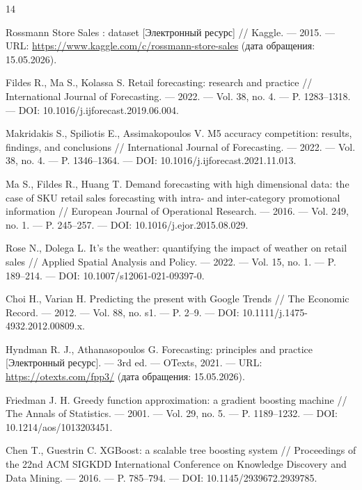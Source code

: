 \documentclass[12pt,a4paper]{article}
\numberwithin{equation}{section}
\begin{document}
\begin{thebibliography}{14}

Rossmann Store Sales : dataset [Электронный ресурс] // Kaggle. --- 2015. ---
URL: \url{https://www.kaggle.com/c/rossmann-store-sales} (дата обращения:
15.05.2026).

Fildes R., Ma S., Kolassa S. Retail forecasting: research and practice //
International Journal of Forecasting. --- 2022. --- Vol. 38, no. 4. ---
P. 1283--1318. --- DOI: 10.1016/j.ijforecast.2019.06.004.

Makridakis S., Spiliotis E., Assimakopoulos V. M5 accuracy competition:
results, findings, and conclusions // International Journal of Forecasting. ---
2022. --- Vol. 38, no. 4. --- P. 1346--1364. ---
DOI: 10.1016/j.ijforecast.2021.11.013.

Ma S., Fildes R., Huang T. Demand forecasting with high dimensional data: the
case of SKU retail sales forecasting with intra- and inter-category promotional
information // European Journal of Operational Research. --- 2016. ---
Vol. 249, no. 1. --- P. 245--257. --- DOI: 10.1016/j.ejor.2015.08.029.

Rose N., Dolega L. It's the weather: quantifying the impact of weather on
retail sales // Applied Spatial Analysis and Policy. --- 2022. --- Vol. 15,
no. 1. --- P. 189--214. --- DOI: 10.1007/s12061-021-09397-0.

Choi H., Varian H. Predicting the present with Google Trends // The Economic
Record. --- 2012. --- Vol. 88, no. s1. --- P. 2--9. ---
DOI: 10.1111/j.1475-4932.2012.00809.x.

Hyndman R. J., Athanasopoulos G. Forecasting: principles and practice
[Электронный ресурс]. --- 3rd ed. --- OTexts, 2021. ---
URL: \url{https://otexts.com/fpp3/} (дата обращения: 15.05.2026).

Friedman J. H. Greedy function approximation: a gradient boosting machine //
The Annals of Statistics. --- 2001. --- Vol. 29, no. 5. --- P. 1189--1232. ---
DOI: 10.1214/aos/1013203451.

Chen T., Guestrin C. XGBoost: a scalable tree boosting system // Proceedings
of the 22nd ACM SIGKDD International Conference on Knowledge Discovery and Data
Mining. --- 2016. --- P. 785--794. --- DOI: 10.1145/2939672.2939785.


\end{thebibliography}
\end{document}

